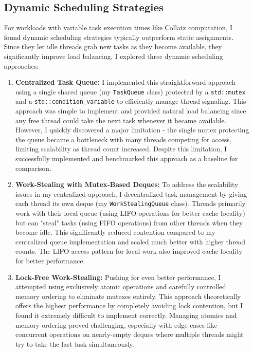 \documentclass[10pt]{article}
\newcommand{\code}[1]{\texttt{#1}} %
\begin{document}
\subsection{Dynamic Scheduling Strategies}
For workloads with variable task execution times like Collatz computation, I found dynamic scheduling strategies typically outperform static assignments. Since they let idle threads grab new tasks as they become available, they significantly improve load balancing. I explored three dynamic scheduling approaches:

\begin{enumerate}
    \item \textbf{Centralized Task Queue:} I implemented this straightforward approach using a single shared queue (my \code{TaskQueue} class) protected by a \code{std::mutex} and a \code{std::condition\_variable} to efficiently manage thread signaling. This approach was simple to implement and provided natural load balancing since any free thread could take the next task whenever it became available. However, I quickly discovered a major limitation - the single mutex protecting the queue became a bottleneck with many threads competing for access, limiting scalability as thread count increased. Despite this limitation, I successfully implemented and benchmarked this approach as a baseline for comparison.

    \item \textbf{Work-Stealing with Mutex-Based Deques:} To address the scalability issues in my centralized approach, I decentralized task management by giving each thread its own deque (my \code{WorkStealingQueue} class). Threads primarily work with their local queue (using LIFO operations for better cache locality) but can "steal" tasks (using FIFO operations) from other threads when they become idle. This significantly reduced contention compared to my centralized queue implementation and scaled much better with higher thread counts. The LIFO access pattern for local work also improved cache locality for better performance.

    \item \textbf{Lock-Free Work-Stealing:} Pushing for even better performance, I attempted using exclusively atomic operations and carefully controlled memory ordering to eliminate mutexes entirely. This approach theoretically offers the highest performance by completely avoiding lock contention, but I found it extremely difficult to implement correctly. Managing atomics and memory ordering proved challenging, especially with edge cases like concurrent operations on nearly-empty deques where multiple threads might try to take the last task simultaneously.
\end{enumerate}
\end{document}
